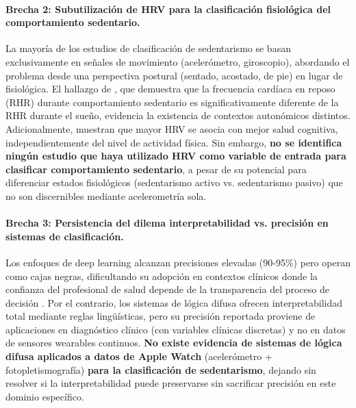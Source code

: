 
\paragraph{Brecha 2: Subutilización de HRV para la clasificación fisiológica del comportamiento sedentario.}

La mayoría de los estudios de clasificación de sedentarismo se basan exclusivamente en señales de movimiento (acelerómetro, giroscopio), abordando el problema desde una perspectiva postural (sentado, acostado, de pie) en lugar de fisiológica. El hallazgo de \cite{Godkin2025Context}, que demuestra que la frecuencia cardíaca en reposo (RHR) durante comportamiento sedentario es significativamente diferente de la RHR durante el sueño, evidencia la existencia de contextos autonómicos distintos. Adicionalmente, \cite{Marino2024ARIC} muestran que mayor HRV se asocia con mejor salud cognitiva, independientemente del nivel de actividad física. Sin embargo, \textbf{no se identifica ningún estudio que haya utilizado HRV como variable de entrada para clasificar comportamiento sedentario}, a pesar de su potencial para diferenciar estados fisiológicos (sedentarismo activo vs. sedentarismo pasivo) que no son discernibles mediante acelerometría sola.


\paragraph{Brecha 3: Persistencia del dilema interpretabilidad vs. precisión en sistemas de clasificación.}

Los enfoques de deep learning \cite{Khan2024Wearable, Bassani2025DLHAR} alcanzan precisiones elevadas (90-95\%) pero operan como cajas negras, dificultando su adopción en contextos clínicos donde la confianza del profesional de salud depende de la transparencia del proceso de decisión \cite{Bienefeld2023XAI}. Por el contrario, los sistemas de lógica difusa \cite{Capitoli2025FuzzyXAI, MarashiHosseini2023Dietary} ofrecen interpretabilidad total mediante reglas lingüísticas, pero su precisión reportada proviene de aplicaciones en diagnóstico clínico (con variables clínicas discretas) y no en datos de sensores wearables continuos. \textbf{No existe evidencia de sistemas de lógica difusa aplicados a datos de Apple Watch} (acelerómetro + fotopletismografía) \textbf{para la clasificación de sedentarismo}, dejando sin resolver si la interpretabilidad puede preservarse sin sacrificar precisión en este dominio específico.

